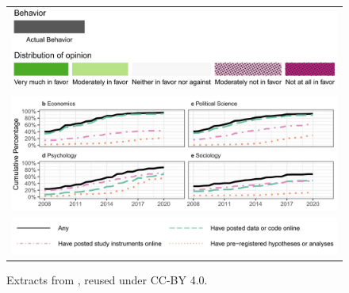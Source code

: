 \documentclass{Revue-economique}
\newcommand{\citet}{\textcite}
\begin{document}
\begin{Article} [%
	Titre={Reproducibility and Open Science in Economics},
	Auteur={Lars Vilhuber\thanks{Cornell University, lars.vilhuber@cornell.edu}}]
\begin{refsection}[Main]
\begin{figure}
\begin{tabular}{c}
    \\
    \includegraphics[width=0.30\linewidth]{data/christensen-2019-fig1-legend.png}
         \\[0.5cm]
    \includegraphics[width=0.65\linewidth]{data/christensen-2019-fig7.png}
\\
    
    \includegraphics[width=0.5\linewidth]{data/christensen-2019-fig7-legend.png}
    \\
    \end{tabular}
    \caption{Extracts from \citet[Figures 1 and 7]{ferguson_survey_2023}, reused under CC-BY 4.0.}
    \label{fig:christensen-fig1b}
\end{figure}







\end{refsection}
\end{Article}
\end{document}
